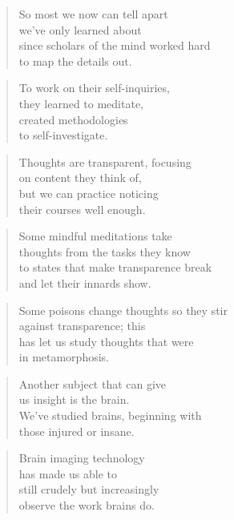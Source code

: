 \documentclass[14pt,a4paper]{article}
\begin{document}
\begin{verse}
So most we now can tell apart\\
we’ve only learned about\\
since scholars of the mind worked hard\\
to map the details out.
\end{verse}

\begin{verse}
To work on their self-inquiries,\\
they learned to meditate,\\
created methodologies\\
to self-investigate.
\end{verse}

\begin{verse}
Thoughts are transparent, focusing\\
on content they think of,\\
but we can practice noticing\\
their courses well enough.
\end{verse}

\begin{verse}
Some mindful meditations take\\
thoughts from the tasks they know\\
to states that make transparence break\\
and let their innards show.
\end{verse}

\begin{verse}
Some poisons change thoughts so they stir\\
against transparence; this\\
has let us study thoughts that were\\
in metamorphosis.
\end{verse}

\begin{verse}
Another subject that can give\\
us insight is the brain.\\
We’ve studied brains, beginning with\\
those injured or insane.
\end{verse}

\begin{verse}
Brain imaging technology\\
has made us able to\\
still crudely but increasingly\\
observe the work brains do.
\end{verse}
\end{document}
